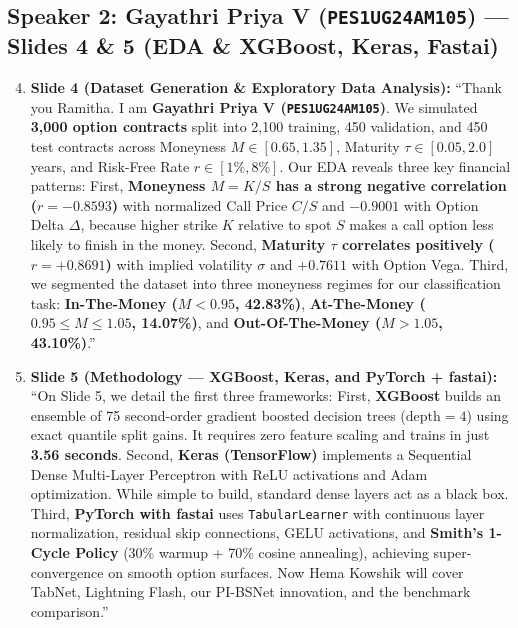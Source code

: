 \documentclass[10pt]{article}
\begin{document}
\subsection*{\color{navy}Speaker 2: Gayathri Priya V (\texttt{PES1UG24AM105}) --- Slides 4 \& 5 (EDA \& XGBoost, Keras, Fastai)}
\begin{enumerate}
    \setcounter{enumi}{3}
    \item \textbf{Slide 4 (Dataset Generation \& Exploratory Data Analysis):}
    ``Thank you Ramitha. I am \textbf{Gayathri Priya V (\texttt{PES1UG24AM105})}. We simulated \textbf{3,000 option contracts} split into 2,100 training, 450 validation, and 450 test contracts across Moneyness $M \in [0.65, 1.35]$, Maturity $\tau \in [0.05, 2.0]$ years, and Risk-Free Rate $r \in [1\%, 8\%]$.
    Our EDA reveals three key financial patterns:
    First, \textbf{Moneyness $M = K/S$ has a strong negative correlation ($r = -0.8593$)} with normalized Call Price $C/S$ and $-0.9001$ with Option Delta $\Delta$, because higher strike $K$ relative to spot $S$ makes a call option less likely to finish in the money.
    Second, \textbf{Maturity $\tau$ correlates positively ($r = +0.8691$)} with implied volatility $\sigma$ and $+0.7611$ with Option Vega.
    Third, we segmented the dataset into three moneyness regimes for our classification task: \textbf{In-The-Money ($M < 0.95$, 42.83\%)}, \textbf{At-The-Money ($0.95 \le M \le 1.05$, 14.07\%)}, and \textbf{Out-Of-The-Money ($M > 1.05$, 43.10\%)}.''

    \item \textbf{Slide 5 (Methodology --- XGBoost, Keras, and PyTorch + fastai):}
    ``On Slide 5, we detail the first three frameworks:
    First, \textbf{XGBoost} builds an ensemble of 75 second-order gradient boosted decision trees ($\text{depth}=4$) using exact quantile split gains. It requires zero feature scaling and trains in just \textbf{3.56 seconds}.
    Second, \textbf{Keras (TensorFlow)} implements a Sequential Dense Multi-Layer Perceptron with ReLU activations and Adam optimization. While simple to build, standard dense layers act as a black box.
    Third, \textbf{PyTorch with fastai} uses \texttt{TabularLearner} with continuous layer normalization, residual skip connections, GELU activations, and \textbf{Smith's 1-Cycle Policy} (30\% warmup + 70\% cosine annealing), achieving super-convergence on smooth option surfaces. Now Hema Kowshik will cover TabNet, Lightning Flash, our PI-BSNet innovation, and the benchmark comparison.''
\end{enumerate}
\end{document}
